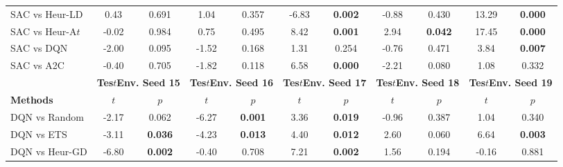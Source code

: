 \begin{tabular}{lcccccccccc}
	SAC vs Heur-LD   & 0.43           & 0.691                  & 1.04           & 0.357                  & -6.83          & \textbf{0.002}         & -0.88          & 0.430                  & 13.29          & \textbf{0.000}         \\
	SAC vs Heur-A$t$  & -0.02          & 0.984                  & 0.75           & 0.495                  & 8.42           & \textbf{0.001}         & 2.94           & \textbf{0.042}         & 17.45          & \textbf{0.000}         \\
	SAC vs DQN       & -2.00          & 0.095                  & -1.52          & 0.168                  & 1.31           & 0.254                  & -0.76          & 0.471                  & 3.84           & \textbf{0.007}         \\
	SAC vs A2C       & -0.40          & 0.705                  & -1.82          & 0.118                  & 6.58           & \textbf{0.000}         & -2.21          & 0.080                  & 1.08           & 0.332                  \\
	\midrule 
	& \multicolumn{2}{c}{\textbf{Tes$t$Env. Seed 15}} & \multicolumn{2}{c}{\textbf{Tes$t$Env. Seed 16}} & \multicolumn{2}{c}{\textbf{Tes$t$Env. Seed 17}} & \multicolumn{2}{c}{\textbf{Tes$t$Env. Seed 18}} & \multicolumn{2}{c}{\textbf{Tes$t$Env. Seed 19}} \\
	\cmidrule(lr){2-3} \cmidrule(lr){4-5} \cmidrule(lr){6-7} \cmidrule(lr){8-9} \cmidrule(lr){10-11}
	\textbf{Methods} & $t$               & $p$                          & $t$               & $p$                          & $t$               & $p$                          & $t$               & $p$                          & $t$               & $p$                          \\
	\midrule 
	DQN vs Random    & -2.17          & 0.062                  & -6.27          & \textbf{0.001}         & 3.36           & \textbf{0.019}         & -0.96          & 0.387                  & 1.04           & 0.340                  \\
	DQN vs ETS       & -3.11          & \textbf{0.036}         & -4.23          & \textbf{0.013}         & 4.40           & \textbf{0.012}         & 2.60           & 0.060                  & 6.64           & \textbf{0.003}         \\
	DQN vs Heur-GD   & -6.80          & \textbf{0.002}         & -0.40          & 0.708                  & 7.21           & \textbf{0.002}         & 1.56           & 0.194                  & -0.16          & 0.881                  \\

\end{tabular}
